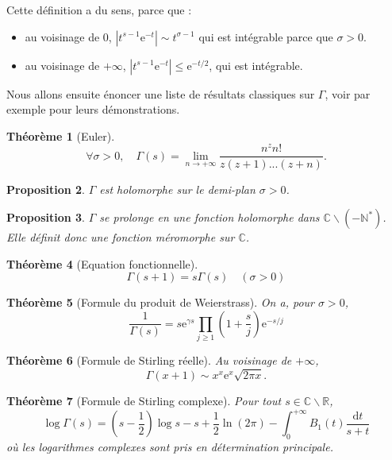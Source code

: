 \documentclass[french]{report}
\newtheorem{theorem}{Théorème}[section]
\newtheorem{proposition}[theorem]{Proposition}
\begin{document}
Cette définition a du sens, parce que :
\begin{itemize}
  \item au voisinage de 0, $|t^{s-1}\mathrm{e}^{-t}|\sim t^{\sigma-1}$ qui est intégrable parce que $\sigma>0$.
  \item au voisinage de $+\infty$, $|t^{s-1}\mathrm{e}^{-t}|\leq \mathrm{e}^{-t/2}$, qui est intégrable.
\end{itemize}

Nous allons ensuite énoncer une liste de résultats classiques sur $\Gamma$, voir par exemple \cite{tenenbaum} pour leurs démonstrations.

\begin{theorem}[Euler]
  \[
    \forall \sigma>0,\quad
    \Gamma(s)=\lim_{n\to+\infty}\frac{n^zn!}{z(z+1)...(z+n)}.  
  \]
\end{theorem}

\begin{proposition}
  $\Gamma$ est holomorphe sur le demi-plan $\sigma>0$.
\end{proposition}

\begin{proposition}
  $\Gamma$ se prolonge en une fonction holomorphe dans $\mathbb{C}\backslash(-\mathbb{N}^*)$. Elle définit donc une fonction méromorphe sur $\mathbb{C}$.
\end{proposition}

\begin{theorem}[Equation fonctionnelle]\label{thm:gamma-equation-fonctionnelle}
  \[
    \Gamma(s+1)=s\Gamma(s)\quad(\sigma>0)
  \]
\end{theorem}

\begin{theorem}[Formule du produit de Weierstrass]\label{thm:gamma-weierstrass}
  On a, pour $\sigma>0$,
  \[
    \frac{1}{\Gamma(s)}
    =s\mathrm{e}^{\gamma s}\prod_{j\geq 1}\left(1+\frac{s}{j}\right)\mathrm{e}^{-s/j}
  \]
\end{theorem}

\begin{theorem}[Formule de Stirling réelle]\label{thm:stirling-reel}
  Au voisinage de $+\infty$,
  \[
    \Gamma(x+1)
    \sim x^x\mathrm{e}^x\sqrt{2\pi x}.
  \]
\end{theorem}

\begin{theorem}[Formule de Stirling complexe]\label{thm:stirling-complexe}
  Pour tout $s\in\mathbb{C}\backslash\mathbb{R}$,
  \[
    \log\Gamma(s)
    = (s-\frac{1}{2})\log s
    - s
    + \frac{1}{2}\ln(2\pi)
    - \int_0^{+\infty} B_1(t)\frac{\mathrm{d}t}{s+t}
  \]
  où les logarithmes complexes sont pris en détermination principale.
\end{theorem}
\end{document}
